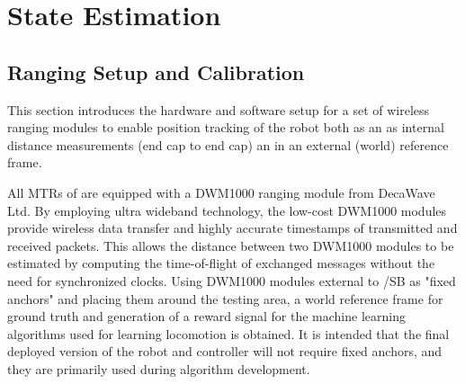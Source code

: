 \chapter{State Estimation}
\label{state_estimation}


\section{Ranging Setup and Calibration}
\label{ranging}
\label{txt:ranging}
This section introduces the hardware and software setup for a set of wireless ranging modules to enable 
position tracking of the robot both as an as internal distance measurements (end cap to end cap) an in an external (world) reference frame.

All MTRs of \SB{} are equipped with a DWM1000 ranging module from DecaWave Ltd.
By employing ultra wideband technology, the low-cost DWM1000 modules provide wireless data transfer and highly accurate timestamps of transmitted and received packets. 
This allows the distance between two DWM1000 modules to be estimated by computing the time-of-flight of exchanged messages without the need for synchronized clocks.
Using DWM1000 modules external to /SB{} as "fixed anchors" and placing them around the testing area, a world reference frame for
 ground truth and generation of a reward signal for the machine learning algorithms used for learning locomotion is obtained.  
It is intended that the final deployed version of the robot and controller will not require fixed anchors, and they are primarily
used during algorithm development.


